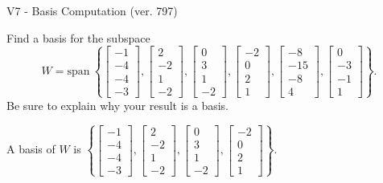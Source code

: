 \begin{exercise}
  \begin{exerciseTitle}V7 - Basis Computation (ver. 797)\end{exerciseTitle}
  \begin{exerciseStatement}
    Find a basis for the subspace 
\[W=\mathrm{span}\ \left\{\left[\begin{array}{r}
-1 \\
-4 \\
-4 \\
-3
\end{array}\right] , \left[\begin{array}{r}
2 \\
-2 \\
1 \\
-2
\end{array}\right] , \left[\begin{array}{r}
0 \\
3 \\
1 \\
-2
\end{array}\right] , \left[\begin{array}{r}
-2 \\
0 \\
2 \\
1
\end{array}\right] , \left[\begin{array}{r}
-8 \\
-15 \\
-8 \\
4
\end{array}\right] , \left[\begin{array}{r}
0 \\
-3 \\
-1 \\
1
\end{array}\right]\right\}.\]
 Be sure to explain why your result is a basis.


  \end{exerciseStatement}
  \begin{exerciseAnswer}
   A basis of \(W\) is  \(\left\{\left[\begin{array}{r}
-1 \\
-4 \\
-4 \\
-3
\end{array}\right] , \left[\begin{array}{r}
2 \\
-2 \\
1 \\
-2
\end{array}\right] , \left[\begin{array}{r}
0 \\
3 \\
1 \\
-2
\end{array}\right] , \left[\begin{array}{r}
-2 \\
0 \\
2 \\
1
\end{array}\right]\right\}\).
  


  \end{exerciseAnswer}
\end{exercise}